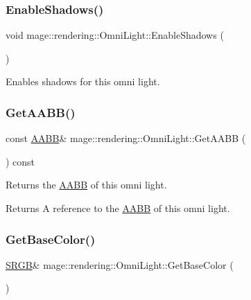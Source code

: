 \subsubsection{\texorpdfstring{Enable\+Shadows()}{EnableShadows()}}
{\footnotesize\ttfamily void mage\+::rendering\+::\+Omni\+Light\+::\+Enable\+Shadows (\begin{DoxyParamCaption}{ }\end{DoxyParamCaption})\hspace{0.3cm}{\ttfamily [noexcept]}}

Enables shadows for this omni light. \hypertarget{classmage_1_1rendering_1_1_omni_light_aa3408de0d62c39d09e0b5aaccf61406a}{}\label{classmage_1_1rendering_1_1_omni_light_aa3408de0d62c39d09e0b5aaccf61406a} 
\subsubsection{\texorpdfstring{Get\+A\+A\+B\+B()}{GetAABB()}}
{\footnotesize\ttfamily const \hyperlink{classmage_1_1_a_a_b_b}{A\+A\+BB}\& mage\+::rendering\+::\+Omni\+Light\+::\+Get\+A\+A\+BB (\begin{DoxyParamCaption}{ }\end{DoxyParamCaption}) const\hspace{0.3cm}{\ttfamily [noexcept]}}

Returns the \hyperlink{classmage_1_1_a_a_b_b}{A\+A\+BB} of this omni light.

\begin{DoxyReturn}{Returns}
A reference to the \hyperlink{classmage_1_1_a_a_b_b}{A\+A\+BB} of this omni light. 
\end{DoxyReturn}
\hypertarget{classmage_1_1rendering_1_1_omni_light_a37a2f333a11239a497b4a087cf495b74}{}\label{classmage_1_1rendering_1_1_omni_light_a37a2f333a11239a497b4a087cf495b74} 
\subsubsection{\texorpdfstring{Get\+Base\+Color()}{GetBaseColor()}\hspace{0.1cm}{\footnotesize\ttfamily [1/2]}}
{\footnotesize\ttfamily \hyperlink{structmage_1_1_s_r_g_b}{S\+R\+GB}\& mage\+::rendering\+::\+Omni\+Light\+::\+Get\+Base\+Color (\begin{DoxyParamCaption}{ }\end{DoxyParamCaption})\hspace{0.3cm}{\ttfamily [noexcept]}}

